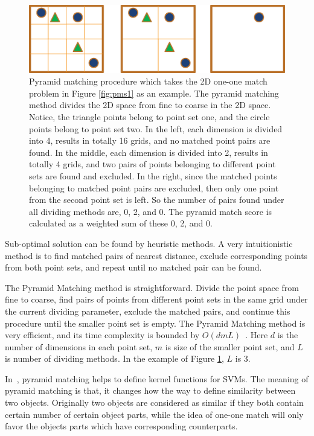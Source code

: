 \begin{figure}
\centering
\includegraphics[width=1\textwidth]{pms2.eps}
\caption[Pyramid matching procedure]{Pyramid matching procedure which takes the 2D one-one match problem in Figure \ref{fig:pms1} as an example. The pyramid matching method divides the 2D space from fine to coarse in the 2D space. Notice, the triangle points belong to point set one, and the circle points belong to point set two. In the left, each dimension is divided into 4, results in totally 16 grids, and no matched point pairs are found. In the middle, each dimension is divided into 2, results in totally 4 grids, and two pairs of points belonging to different point sets are found and excluded. In the right, since the matched points belonging to matched point pairs are excluded, then only one point from the second point set is left. So the number of pairs found under all dividing methods are, 0, 2, and 0. The pyramid match score is calculated as a weighted sum of these 0, 2, and 0. }
\label{fig:p2}
\end{figure}




Sub-optimal solution can be found by heuristic methods. A very intuitionistic method is to find matched pairs of nearest distance, exclude corresponding points from both point sets, and repeat until no matched pair can be found.

The Pyramid Matching method is straightforward. Divide the point space from fine to coarse, find pairs of points from different point sets in the same grid under the current dividing parameter, exclude the matched pairs, and continue this procedure until the smaller point set is empty. The Pyramid Matching method is very efficient, and its time complexity is bounded by $O(dmL)$~\citep{pmk}. Here $d$ is the number of dimensions in each point set, $m$ is size of the smaller point set, and $L$ is number of dividing methods. In the example of Figure \ref{fig:p2}, $L$ is 3.

In~\citep{pmk}, pyramid matching helps to define kernel functions for SVMs. The meaning of pyramid matching is that, it changes how the way to define similarity between two objects. Originally two objects are considered as similar if they both contain certain number of certain object parts, while the idea of one-one match will only favor the objects parts which have corresponding counterparts.

